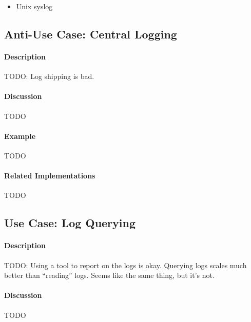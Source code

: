 \begin{itemize}
	\item Unix\texttrademark{} syslog
\end{itemize}

\subsection{Anti-Use Case: Central Logging}

\paragraph{Description}

{\Large TODO:} Log shipping is bad.

\paragraph{Discussion}

{\Large TODO}

\paragraph{Example}

{\Large TODO}

\paragraph{Related Implementations}

{\Large TODO}

\subsection{Use Case: Log Querying}

\paragraph{Description}

{\Large TODO:} Using a tool to report on the logs is okay.  Querying logs scales much better than ``reading'' logs.  Seems like the same thing, but it's not.

\paragraph{Discussion}

{\Large TODO}

